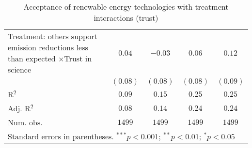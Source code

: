 \begin{table}[h]
\begin{center}
\begin{tabular}{l c c c c}
\shortstack{Treatment: others support\\emission reductions\\less than expected\\$\times$Trust in science} & $0.04$        & $-0.03$       & $0.06$        & $0.12$        \\
                                                                                                          & $(0.08)$      & $(0.08)$      & $(0.08)$      & $(0.09)$      \\
\hline
R$^2$                                                                                                     & $0.09$        & $0.15$        & $0.25$        & $0.25$        \\
Adj. R$^2$                                                                                                & $0.08$        & $0.14$        & $0.24$        & $0.24$        \\
Num. obs.                                                                                                 & $1499$        & $1499$        & $1499$        & $1499$        \\
\hline
\multicolumn{5}{l}{\scriptsize{Standard errors in parentheses. $^{***}p<0.001$; $^{**}p<0.01$; $^{*}p<0.05$}}
\end{tabular}
\caption{Acceptance of renewable energy technologies with treatment interactions (trust)}
\label{table:acceptance_interactions_trust}
\end{center}
\end{table}
